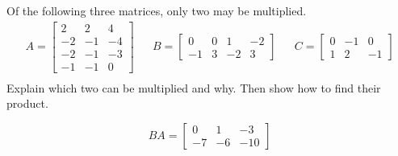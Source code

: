 
\begin{exerciseStatement}


Of the following three matrices, only two may be multiplied. 
\begin{align*} A= \left[\begin{array}{ccc}
2 & 2 & 4 \\
-2 & -1 & -4 \\
-2 & -1 & -3 \\
-1 & -1 & 0
\end{array}\right]  & & B= \left[\begin{array}{cccc}
0 & 0 & 1 & -2 \\
-1 & 3 & -2 & 3
\end{array}\right]  & & C= \left[\begin{array}{ccc}
0 & -1 & 0 \\
1 & 2 & -1
\end{array}\right]  \\ \end{align*}
             Explain which two can be multiplied and why. Then show how to find their product.


\end{exerciseStatement}
    
\begin{exerciseAnswer} 
\[BA= \left[\begin{array}{ccc}
0 & 1 & -3 \\
-7 & -6 & -10
\end{array}\right] \]
\end{exerciseAnswer}
    
